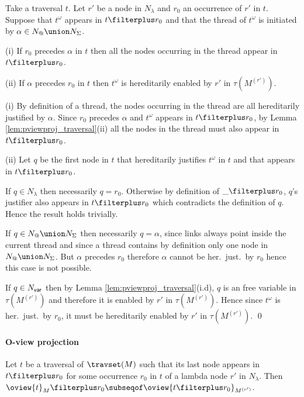 \begin{lemma}
\label{lem:thread_projplus} Take a traversal $t$.  Let $r'$ be a
node in $N_\lambda$ and $r_0$ an occurrence of $r'$ in $t$. Suppose
that $t^\omega$ appears in $t\filterplus r_0$ and that the thread of
$t^\omega$ is initiated by $\alpha \in N_@ \union N_\Sigma$.

(i) If $r_0$ precedes $\alpha$ in $t$ then all the nodes occurring in the thread appear in $t\filterplus r_0$.

(ii) If $\alpha$ precedes $r_0$ in $t$ then
    $t^\omega$ is hereditarily enabled by $r'$ in $\tau(M^{(r')})$.
\end{lemma}
\proof
(i) By definition of a thread, the nodes occurring in the thread
are all hereditarily justified by $\alpha$.
Since $r_0$ precedes $\alpha$ and $t^\omega$ appears in $t\filterplus r_0$, by Lemma \ref{lem:pviewproj_traversal}(ii) all the nodes in the thread must also appear in $t \filterplus r_0$.

(ii)
Let $q$ be the first node in $t$ that hereditarily justifies
$t^\omega$ in $t$ and that appears in $t\filterplus r_0$.


If $q \in N_\lambda$ then necessarily $q = r_0$. Otherwise by definition of $\_\filterplus r_0$,
$q$'s justifier also appears in $t\filterplus r_0$ which contradicts
the definition of $q$. Hence the result holds trivially.

If $q\in N_@\union N_\Sigma$ then necessarily $q=\alpha$, since
links always point inside the current thread and since a thread contains by definition only one node in $N_@\union N_\Sigma$. But $\alpha$ precedes $r_0$ therefore $\alpha$ cannot be her.\ just.\ by $r_0$ hence this case is not possible.

If $q \in N_{\sf var}$ then by Lemma \ref{lem:pviewproj_traversal}(i.d),
$q$ is an free variable in $\tau(M^{(r')})$ and therefore
it is enabled by $r'$ in $\tau(M^{(r')})$. Hence since $t^\omega$ is her.\ just.\ by $r_0$, it must be hereditarily enabled
by $r'$ in $\tau(M^{(r')})$. \qed

\paragraph{O-view projection}

\begin{proposition}
\label{prop:oview_trav_projection}
   Let $t$ be a traversal of $\travset(M)$ such that its last node
   appears in $t \filterplus r_0$ for some occurrence $r_0$ in $t$ of a lambda node $r'$ in $N_\lambda$.
   Then $ \oview{t}_M\filterplus r_0 \subseqof \oview{t\filterplus r_0}_{M^{(r')}}$.
\end{proposition}

